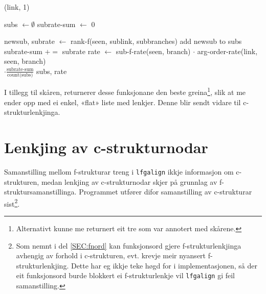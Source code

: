 \documentclass[11pt,a4paper,oneside,draft]{book}
\begin{document}
     \begin{algorithm}[]
      \caption{rank-f(seen, link, branches)}
      \label{algo:rank-f}

       {\Return (link, 1)}
      \end{algorithm}

      \begin{algorithm}[]
      subs $\gets \emptyset$ \;
      subrate-sum $\gets$ 0 \;
      \caption{rank-branch(seen, link, branch)}
      \label{algo:rank-branch}
         {
          newsub, subrate $\gets$ rank-f(seen, sublink, subbranches) \;
          add newsub to subs \;
          subrate-sum $+=$ subrate \;
        }
        rate $\gets$ sub-f-rate(seen, branch) $\cdot$ arg-order-rate(link, seen, branch) \\
        \hfill $\cdot \frac{\text{subrate-sum}}{\text{count(subs)}}$ \;
        \Return subs, rate \;
      \end{algorithm}

I tillegg til skåren, returnerer desse funksjonane den beste
greina\footnote{Alternativt kunne me returnert eit tre som var annotert med
        skårene. }, slik at me ender opp med ei enkel, «flat» liste med
lenkjer. Denne blir sendt vidare til c-strukturlenkjinga.


\section{Lenkjing av c-strukturnodar}
\label{sec-4.3}

Samanstilling mellom f-strukturar treng i \texttt{lfgalign} ikkje informasjon
om c-strukturen, medan lenkjing av c-strukturnodar skjer på grunnlag
av f-struktursamanstillinga. Programmet utfører difor samanstilling av
c-strukturar sist\footnote{Som nemnt i del \ref{SEC:fnord} kan funksjonsord gjere
       f-strukturlenkjinga avhengig av forhold i c-strukturen,
       evt. krevje meir nyansert f-strukturlenkjing. Dette har eg
       ikkje teke høgd for i implementasjonen, så der eit funksjonsord
       burde blokkert ei f-strukturlenkje vil \texttt{lfgalign} gi feil
       samanstilling. }.
\end{document}
